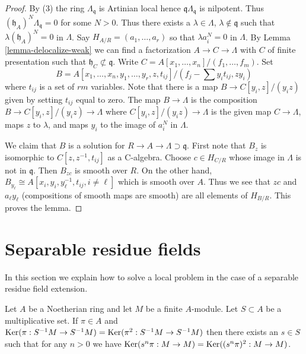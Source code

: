 \begin{proof}
By (3) the ring $\Lambda_\mathfrak q$ is Artinian local hence
$\mathfrak q\Lambda_\mathfrak q$ is nilpotent. Thus
$(\mathfrak h_A)^N \Lambda_\mathfrak q = 0$ for some $N > 0$.
Thus there exists a $\lambda \in \Lambda$, $\lambda \not \in \mathfrak q$
such that $\lambda (\mathfrak h_A)^N = 0$ in $\Lambda$.
Say $H_{A/R} = (a_1, \ldots, a_r)$ so that $\lambda a_i^N = 0$
in $\Lambda$. By Lemma \ref{lemma-delocalize-weak} we can find a factorization
$A \to C \to \Lambda$ with $C$ of finite presentation such that
$\mathfrak h_C \not \subset \mathfrak q$.
Write $C = A[x_1, \ldots, x_n]/(f_1, \ldots, f_m)$.
Set
$$
B = A[x_1, \ldots, x_n, y_1, \ldots, y_r, z, t_{ij}]/
(f_j - \sum y_i t_{ij}, zy_i)
$$
where $t_{ij}$ is a set of $rm$ variables.
Note that there is a map $B \to C[y_i, z]/(y_iz)$ given by setting $t_{ij}$
equal to zero. The map $B \to \Lambda$ is the composition
$B \to C[y_i, z]/(y_iz) \to \Lambda$ where $C[y_i, z]/(y_iz) \to \Lambda$
is the given map $C \to \Lambda$, maps $z$ to $\lambda$, and maps
$y_i$ to the image of $a_i^N$ in $\Lambda$.

\medskip\noindent
We claim that $B$ is a solution for $R \to A \to \Lambda \supset \mathfrak q$.
First note that $B_z$ is isomorphic to $C[z, z^{-1}, t_{ij}]$
as a C-algebra. Choose $c \in H_{C/R}$ whose image in $\Lambda$ is not in $\mathfrak q$. Then $B_{zc}$ is smooth over $R$. On the other hand,
$B_{y_\ell} \cong A[x_i, y_i, y_\ell^{-1}, t_{ij}, i \not = \ell]$
which is smooth over $A$. Thus we see that $zc$ and $a_\ell y_\ell$
(compositions of smooth maps are smooth) are all
elements of $H_{B/R}$. This proves the lemma.
\end{proof}




\section{Separable residue fields}
\label{section-separable}

\noindent
In this section we explain how to solve a local problem in the case
of a separable residue field extension.

\begin{lemma}[Ogoma]
\label{lemma-ogoma}
Let $A$ be a Noetherian ring and let $M$ be a finite $A$-module.
Let $S \subset A$ be a multiplicative set. If $\pi \in A$ and
$\mathop{\mathrm{Ker}}(\pi : S^{-1}M \to S^{-1}M) =
\mathop{\mathrm{Ker}}(\pi^2 : S^{-1}M \to S^{-1}M)$
then there exists an $s \in S$ such that for any $n > 0$ we have
$\mathop{\mathrm{Ker}}(s^n\pi : M \to M) = \mathop{\mathrm{Ker}}((s^n\pi)^2 : M \to M)$.
\end{lemma}

